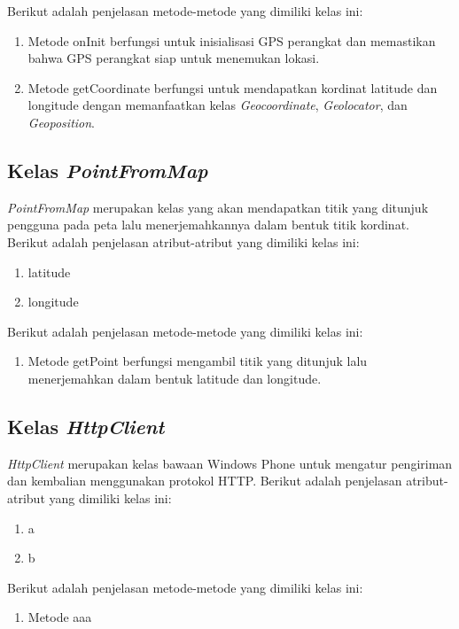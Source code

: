 Berikut adalah penjelasan metode-metode yang dimiliki kelas ini:
\begin{enumerate}
	\item Metode onInit berfungsi untuk inisialisasi GPS perangkat dan memastikan bahwa GPS perangkat siap untuk menemukan lokasi.
	\item Metode getCoordinate berfungsi untuk mendapatkan kordinat latitude dan longitude dengan memanfaatkan kelas \textit{Geocoordinate}, \textit{Geolocator}, dan \textit{Geoposition}.   
\end{enumerate}

\subsection{Kelas \textit{PointFromMap}}
\label{lab:Kelas PointFromMap}
\hspace{0.5cm} \textit{PointFromMap} merupakan kelas yang akan mendapatkan titik yang ditunjuk pengguna pada peta lalu menerjemahkannya dalam bentuk titik kordinat. Berikut adalah penjelasan atribut-atribut yang dimiliki kelas ini:
\begin{enumerate}
	\item latitude
	\item longitude
\end{enumerate}

Berikut adalah penjelasan metode-metode yang dimiliki kelas ini:
\begin{enumerate}
	\item Metode getPoint berfungsi mengambil titik yang ditunjuk lalu menerjemahkan dalam bentuk latitude dan longitude. 
\end{enumerate}

\subsection{Kelas \textit{HttpClient}}
\label{lab:Kelas HttpClient}
\hspace{0.5cm} \textit{HttpClient} merupakan kelas bawaan Windows Phone untuk mengatur pengiriman dan kembalian menggunakan protokol HTTP. Berikut adalah penjelasan atribut-atribut yang dimiliki kelas ini:
\begin{enumerate}
	\item a
	\item b
\end{enumerate}

Berikut adalah penjelasan metode-metode yang dimiliki kelas ini:
\begin{enumerate}
	\item Metode  aaa
\end{enumerate}

